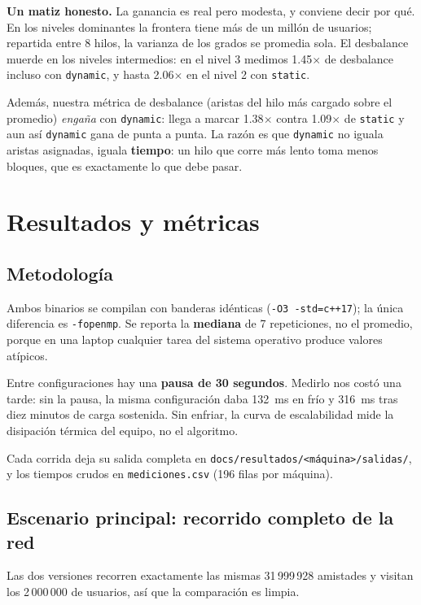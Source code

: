\documentclass[11pt,a4paper]{article}
\begin{document}
\textbf{Un matiz honesto.} La ganancia es real pero modesta, y conviene decir
por qué. En los niveles dominantes la frontera tiene más de un millón de
usuarios; repartida entre 8 hilos, la varianza de los grados se promedia sola.
El desbalance muerde en los niveles intermedios: en el nivel 3 medimos
1.45$\times$ de desbalance incluso con \texttt{dynamic}, y hasta 2.06$\times$
en el nivel 2 con \texttt{static}.

Además, nuestra métrica de desbalance (aristas del hilo más cargado sobre el
promedio) \emph{engaña} con \texttt{dynamic}: llega a marcar 1.38$\times$
contra 1.09$\times$ de \texttt{static} y aun así \texttt{dynamic} gana de punta
a punta. La razón es que \texttt{dynamic} no iguala aristas asignadas, iguala
\textbf{tiempo}: un hilo que corre más lento toma menos bloques, que es
exactamente lo que debe pasar.

\section{Resultados y métricas}

\subsection*{Metodología}

Ambos binarios se compilan con banderas idénticas (\texttt{-O3 -std=c++17});
la única diferencia es \texttt{-fopenmp}. Se reporta la \textbf{mediana} de 7
repeticiones, no el promedio, porque en una laptop cualquier tarea del sistema
operativo produce valores atípicos.

Entre configuraciones hay una \textbf{pausa de 30 segundos}. Medirlo nos costó
una tarde: sin la pausa, la misma configuración daba 132~ms en frío y 316~ms
tras diez minutos de carga sostenida. Sin enfriar, la curva de escalabilidad
mide la disipación térmica del equipo, no el algoritmo.

Cada corrida deja su salida completa en
\texttt{docs/resultados/<máquina>/salidas/}, y los tiempos crudos en
\texttt{mediciones.csv} (196 filas por máquina).

\subsection*{Escenario principal: recorrido completo de la red}

Las dos versiones recorren exactamente las mismas 31\,999\,928 amistades y
visitan los 2\,000\,000 de usuarios, así que la comparación es limpia.
\end{document}
